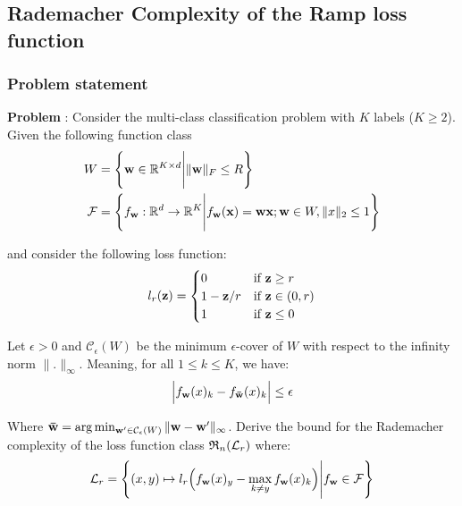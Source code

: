 \newpage
\subsection{Rademacher Complexity of the Ramp loss function}

\subsubsection{Problem statement}
\textbf{Problem} : Consider the multi-class classification problem with $K$ labels ($K\ge2$). Given the following function class
\begin{align*}
    W  &= \Bigg\{ 
        {\bf w}\in \mathbb{R}^{K\times d} \Bigg| \|{\bf w}\|_F \le R
     \Bigg\} \\
    \mathcal{F} &= \Bigg\{ 
        f_{{\bf w}}:\mathbb{R}^d \to \mathbb{R}^{K} \Bigg| f_{\bf w}({\bf x}) = {\bf wx}; {\bf w}\in W, \|x\|_2\le 1
     \Bigg\}
\end{align*}

\noindent and consider the following loss function:
\begin{align*}
    l_r({\bf z}) &= \begin{cases}
        0 & \text{if } {\bf z} \ge r \\
        1 - {\bf z}/r &\text{if } {\bf z} \in (0,r) \\ 
        1 &\text{if } {\bf z} \le 0
    \end{cases} \\
\end{align*}

\noindent Let $\epsilon > 0$ and $\mathcal{C}_\epsilon(W)$ be the minimum $\epsilon$-cover of $W$ with respect to the infinity norm $\|.\|_\infty$. Meaning, for all $1\le k \le K$, we have:
\begin{align*}
    \Big| 
        f_{\bf w}(x)_k - f_{\bf \bar{w}}(x)_k
     \Big| \le \epsilon
\end{align*}

\noindent Where ${\bf \bar{w}} = \arg\min_{{\bf w'} \in \mathcal{C}_\epsilon(W)} \| {\bf w}-{\bf w'} \|_\infty$. Derive the bound for the Rademacher complexity of the loss function class $\mathfrak{R}_n(\mathcal{L}_r)$ where:
\begin{align*}
    \mathcal{L}_r = \Bigg\{ 
        (x, y)\mapsto l_r\Big(  f_{\bf w}(x)_y - \max_{k\ne y} f_{\bf w}(x)_k  \Big) \Bigg| f_{{\bf w}} \in \mathcal{F} 
     \Bigg\}
\end{align*}

